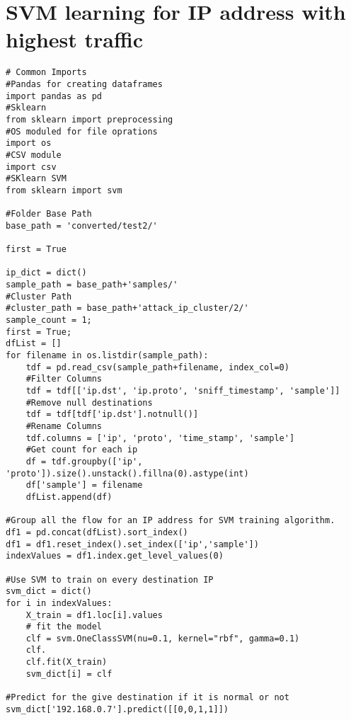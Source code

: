 \documentclass{article}
\begin{document}
\section{SVM learning for IP address with highest traffic}
\begin{verbatim}
# Common Imports
#Pandas for creating dataframes
import pandas as pd
#Sklearn
from sklearn import preprocessing
#OS moduled for file oprations
import os
#CSV module
import csv
#SKlearn SVM
from sklearn import svm

#Folder Base Path
base_path = 'converted/test2/'

first = True

ip_dict = dict()
sample_path = base_path+'samples/'
#Cluster Path
#cluster_path = base_path+'attack_ip_cluster/2/'
sample_count = 1;
first = True;
dfList = []
for filename in os.listdir(sample_path):
    tdf = pd.read_csv(sample_path+filename, index_col=0)
    #Filter Columns
    tdf = tdf[['ip.dst', 'ip.proto', 'sniff_timestamp', 'sample']]
    #Remove null destinations
    tdf = tdf[tdf['ip.dst'].notnull()]
    #Rename Columns
    tdf.columns = ['ip', 'proto', 'time_stamp', 'sample']
    #Get count for each ip
    df = tdf.groupby(['ip', 'proto']).size().unstack().fillna(0).astype(int)
    df['sample'] = filename
    dfList.append(df)

#Group all the flow for an IP address for SVM training algorithm.
df1 = pd.concat(dfList).sort_index()
df1 = df1.reset_index().set_index(['ip','sample'])
indexValues = df1.index.get_level_values(0)

#Use SVM to train on every destination IP
svm_dict = dict()
for i in indexValues:
    X_train = df1.loc[i].values
    # fit the model
    clf = svm.OneClassSVM(nu=0.1, kernel="rbf", gamma=0.1)
    clf.
    clf.fit(X_train)
    svm_dict[i] = clf

#Predict for the give destination if it is normal or not
svm_dict['192.168.0.7'].predict([[0,0,1,1]])

\end{verbatim}
\end{document}
